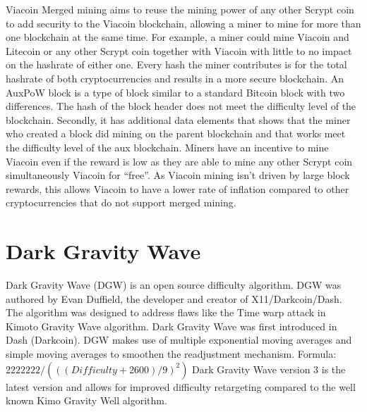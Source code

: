 \documentclass{article}
\begin{document}
Viacoin \cite{auxpow}Merged mining aims to reuse the mining power of any other \cite{scrypt}Scrypt coin
to add security to the Viacoin blockchain,
allowing a miner to mine for more than one blockchain at the same time. For example, a miner
could mine Viacoin and Litecoin or any other Scrypt coin together with Viacoin with little to no impact on the hashrate of either one.
\newline \newline \noindent
Every hash the miner contributes is for the total hashrate of both
cryptocurrencies and results in a more secure blockchain.
An AuxPoW block is a type of block similar to a standard Bitcoin block with two
differences. The hash of the block header does not meet the difficulty level of the
blockchain. Secondly, it has additional data elements that shows that the miner
who created a block did mining on the parent blockchain and that works meet
the difficulty level of the aux blockchain. 
\newline \newline \noindent
Miners have an incentive to mine Viacoin
even if the reward is low as they are able to mine any other Scrypt
coin simultaneously Viacoin for “free”. As Viacoin mining isn't driven by large block rewards,
this allows Viacoin to have a lower rate of inflation
compared to other cryptocurrencies that do not support merged mining.
\newpage

\section{Dark Gravity Wave}\label{sec: Dark Gravity Wave}
\cite{darkGravityWave}Dark Gravity Wave (DGW) is an open source difficulty algorithm. DGW was
authored by Evan Duffield, the developer and creator of X11/Darkcoin/Dash.
The algorithm was designed to address flaws like the Time warp attack in Kimoto
Gravity Wave algorithm. 
\newline \newline \noindent
Dark Gravity Wave was first introduced in Dash
(Darkcoin). DGW makes use of multiple exponential moving averages and simple
moving averages to smoothen the readjustment mechanism.
\newline Formula: \newline \newline
$2222222/ (((Difficulty+2600)/9)^2)$ \newline \newline \noindent
Dark Gravity Wave version 3 is the latest version and allows for improved difficulty retargeting compared
to the well known Kimo Gravity Well algorithm.
\end{document}
